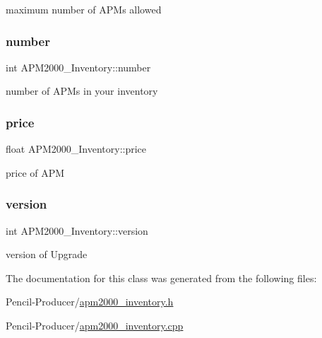 maximum number of A\+P\+Ms allowed 

\mbox{\label{classAPM2000__Inventory_a0393939ee2dd57ec3855bb98070da2ad}} 
\subsubsection{\texorpdfstring{number}{number}}
{\footnotesize\ttfamily int A\+P\+M2000\+\_\+\+Inventory\+::number\hspace{0.3cm}{\ttfamily [private]}}



number of A\+P\+Ms in your inventory 

\mbox{\label{classAPM2000__Inventory_a56588e2f627cbe3fccf6235773d77889}} 
\subsubsection{\texorpdfstring{price}{price}}
{\footnotesize\ttfamily float A\+P\+M2000\+\_\+\+Inventory\+::price\hspace{0.3cm}{\ttfamily [private]}}



price of A\+PM 

\mbox{\label{classAPM2000__Inventory_a49716258b589409d1e8c3c445d19289d}} 
\subsubsection{\texorpdfstring{version}{version}}
{\footnotesize\ttfamily int A\+P\+M2000\+\_\+\+Inventory\+::version\hspace{0.3cm}{\ttfamily [private]}}



version of Upgrade 



The documentation for this class was generated from the following files\+:\begin{DoxyCompactItemize}
\item 
Pencil-\/\+Producer/\mbox{\hyperlink{apm2000__inventory_8h}{apm2000\+\_\+inventory.\+h}}\item 
Pencil-\/\+Producer/\mbox{\hyperlink{apm2000__inventory_8cpp}{apm2000\+\_\+inventory.\+cpp}}\end{DoxyCompactItemize}
